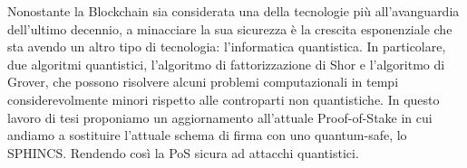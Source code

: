Nonostante la Blockchain sia considerata una della tecnologie più all'avanguardia dell'ultimo decennio, a minacciare la sua sicurezza è la crescita esponenziale che sta avendo un altro tipo di tecnologia: l'informatica quantistica. In particolare, due algoritmi quantistici, l'algoritmo di fattorizzazione di Shor e l'algoritmo di Grover, che possono risolvere alcuni problemi computazionali in tempi considerevolmente minori rispetto alle controparti non quantistiche. In questo lavoro di tesi proponiamo un aggiornamento all'attuale Proof-of-Stake in cui andiamo a sostituire l'attuale schema di firma con uno quantum-safe, lo SPHINCS. Rendendo così la PoS sicura ad attacchi quantistici.